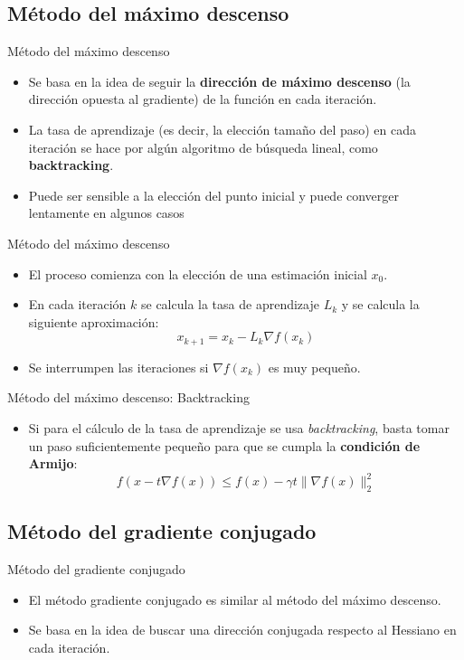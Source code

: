 \documentclass[a4paper,10pt]{beamer}
\begin{document}
\subsection{Método del máximo descenso}
\begin{frame}{Método del máximo descenso}

\begin{itemize}
	\item Se basa en la idea de seguir la \textbf{dirección de máximo descenso} (la dirección opuesta al gradiente) de la función en cada iteración.
	\pause
	\item La tasa de aprendizaje (es decir, la elección tamaño del paso) en cada iteración se hace por algún algoritmo de búsqueda lineal, como \textbf{backtracking}.
	\pause
	\item Puede ser sensible a la elección del punto inicial y puede converger lentamente en algunos casos
\end{itemize}

\end{frame}

\begin{frame}{Método del máximo descenso}
	\begin{itemize}
		\item El proceso comienza con la elección de una estimación inicial $x_0$.
		\item En cada iteración $k$ se calcula la tasa de aprendizaje $L_k$ y se calcula la siguiente aproximación:
			\[ x_{k+1} = x_{k} - L_k \nabla f(x_k) \]
		\item Se interrumpen las iteraciones si $\nabla f(x_k)$ es muy pequeño.
	\end{itemize}
\end{frame}

\begin{frame}{Método del máximo descenso: Backtracking}
	\begin{itemize}
		\item Si para el cálculo de la tasa de aprendizaje se usa \textit{backtracking}, basta tomar un paso suficientemente pequeño para que se cumpla la \textbf{condición de Armijo}:
		\[ f(x-t \nabla f(x)) \leq f(x) - \gamma t \|\nabla f(x)\|_2^2 \]
	\end{itemize}
\end{frame}

\subsection{Método del gradiente conjugado}
\begin{frame}{Método del gradiente conjugado}

\begin{itemize}
	\item El método gradiente conjugado es similar al método del máximo descenso.
	\pause
	\item Se basa en la idea de buscar una dirección conjugada respecto al Hessiano en cada iteración.
\end{itemize}
\end{frame}
\end{document}
